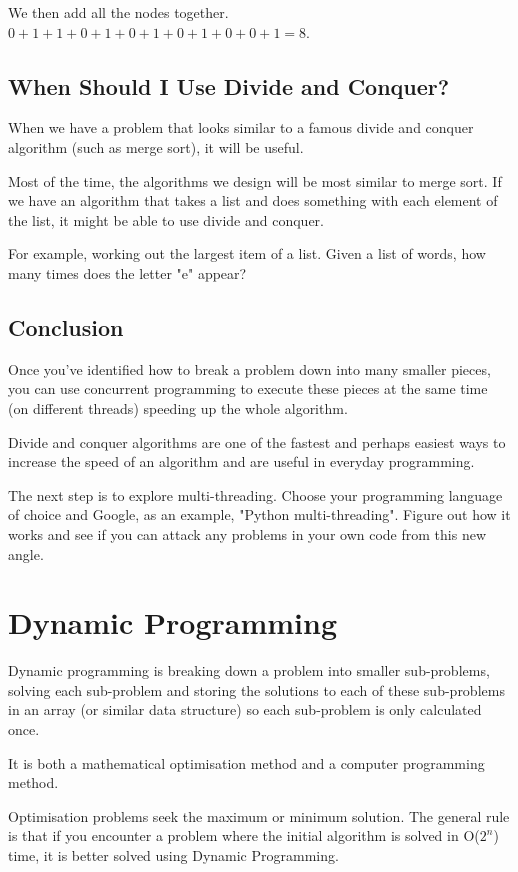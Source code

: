 \documentclass{article}
\begin{document}
We then add all the nodes together. $0 + 1 + 1 + 0 + 1 + 0 + 1 + 0 + 1 + 0 + 0 + 1 = 8$.

\newpage
\subsection{When Should I Use Divide and Conquer?}
When we have a problem that looks similar to a famous divide and conquer algorithm (such as merge sort), it will be useful.

Most of the time, the algorithms we design will be most similar to merge sort. If we have an algorithm that takes a list and does something with each element of the list, it might be able to use divide and conquer. 

For example, working out the largest item of a list. Given a list of words, how many times does the letter "e" appear? 
\newpage
\subsection{Conclusion}
Once you've identified how to break a problem down into many smaller pieces, you can use concurrent programming to execute these pieces at the same time (on different threads) speeding up the whole algorithm. 

Divide and conquer algorithms are one of the fastest and perhaps easiest ways to increase the speed of an algorithm and are useful in everyday programming.

The next step is to explore multi-threading. Choose your programming language of choice and Google, as an example, "Python multi-threading". Figure out how it works and see if you can attack any problems in your own code from this new angle. 
\newpage
\section{Dynamic Programming}
Dynamic programming is breaking down a problem into smaller sub-problems, solving each sub-problem and storing the solutions to each of these sub-problems in an array (or similar data structure) so each sub-problem is only calculated once. 

It is both a mathematical optimisation method and a computer programming method.

Optimisation problems seek the maximum or minimum solution. The general rule is that if you encounter a problem where the initial algorithm is solved in O($2^n$) time, it is better solved using Dynamic Programming.
\newpage
\end{document}
